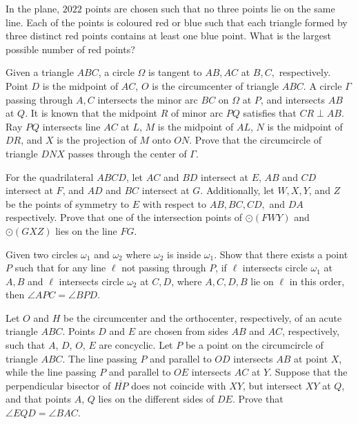 \documentclass[11pt]{scrartcl}
\begin{document}
\begin{problem}[119253293150446]
	In the plane, $2022$ points are chosen such that no three points lie on the same line. Each of the points is coloured red or blue such that each triangle formed by three distinct red points contains at least one blue point.
What is the largest possible number of red points?
\end{problem}
\begin{problem}[1222382895728709073]
	Given a triangle $ABC$, a circle $\Omega$ is tangent to $AB,AC$ at $B,C,$ respectively. Point $D$ is the midpoint of $AC$, $O$ is the circumcenter of triangle $ABC$. A circle $\Gamma$ passing through $A,C$ intersects the minor arc $BC$ on $\Omega$ at $P$, and intersects $AB$ at $Q$. It is known that the midpoint $R$ of minor arc $PQ$ satisfies that $CR \perp AB$. Ray $PQ$ intersects line $AC$ at $L$, $M$ is the midpoint of $AL$, $N$ is the midpoint of $DR$, and $X$ is the projection of $M$ onto $ON$. Prove that the circumcircle of triangle $DNX$ passes through the center of $\Gamma$.
\end{problem}
\begin{problem}[436681276656848]
For the quadrilateral $ABCD$, let $AC$ and $BD$ intersect at $E$, $AB$ and $CD$ intersect at $F$, and $AD$ and $BC$ intersect at $G$. Additionally, let $W, X, Y$, and $Z$ be the points of symmetry to $E$ with respect to $AB, BC, CD,$ and $DA$ respectively. Prove that one of the intersection points of $\odot(FWY)$ and $\odot(GXZ)$ lies on the line $FG$.
\end{problem}
\begin{problem}[7268978143074030034]
Given two circles $\omega_1$ and $\omega_2$ where $\omega_2$ is inside $\omega_1$. Show that there exists a point $P$ such that for any line $\ell$ not passing through $P$, if $\ell$ intersects circle $\omega_1$ at $A,B$ and $\ell$ intersects circle $\omega_2$ at $C,D$, where $A,C,D,B$ lie on $\ell$ in this order, then $\angle APC=\angle BPD$.
\end{problem}
\begin{problem}[457324036151847]
Let $O$ and $H$ be the circumcenter and the orthocenter, respectively, of an acute triangle $ABC$. Points $D$ and $E$ are chosen from sides $AB$ and $AC$, respectively, such that $A$, $D$, $O$, $E$ are concyclic. Let $P$ be a point on the circumcircle of triangle $ABC$. The line passing $P$ and parallel to $OD$ intersects $AB$ at point $X$, while the line passing $P$ and parallel to $OE$ intersects $AC$ at $Y$. Suppose that the perpendicular bisector of $\overline{HP}$ does not coincide with $XY$, but intersect $XY$ at $Q$, and that points $A$, $Q$ lies on the different sides of $DE$. Prove that $\angle EQD = \angle BAC$.
\end{problem}
\end{document}
